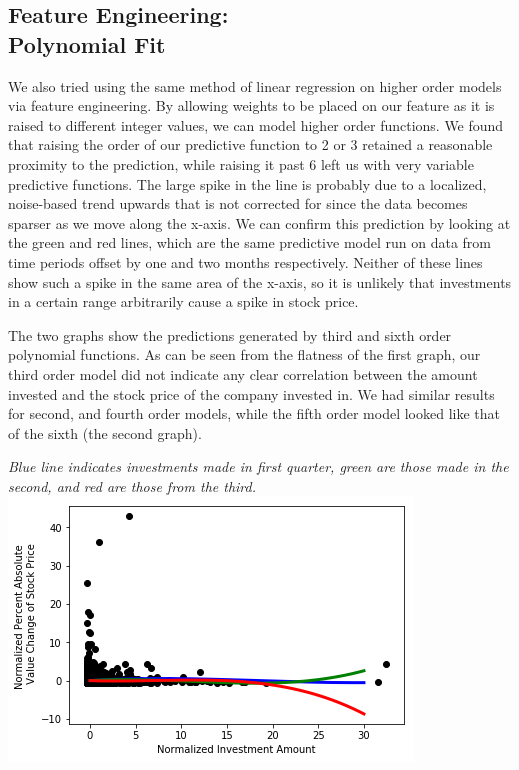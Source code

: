 \documentclass{article}
\begin{document}
\begin{multicols}{2}
\subsection*{Feature Engineering: \\Polynomial Fit}
We also tried using the same method of linear regression on higher order models via feature engineering. By allowing weights to be placed on our feature as it is raised to different integer values, we can model higher order functions. We found that raising the order of our predictive function to 2 or 3 retained a reasonable proximity to the prediction, while raising it past 6 left us with very variable predictive functions. The large spike in the line is probably due to a localized, noise-based trend upwards that is not corrected for since the data becomes sparser as we move along the x-axis. We can confirm this prediction by looking at the green and red lines, which are the same predictive model run on data from time periods offset by one and two months respectively. Neither of these lines show such a spike in the same area of the x-axis, so it is unlikely that investments in a certain range arbitrarily cause a spike in stock price.

The two graphs show the predictions generated by third and sixth order polynomial functions. As can be seen from the flatness of the first graph, our third order model did not indicate any clear correlation between the amount invested and the stock price of the company invested in. We had similar results for second, and fourth order models, while the fifth order model looked like that of the sixth (the second graph). 



\end{multicols}
\textit{Blue line indicates investments made in first quarter, green are those made in the second, and red are those from the third.}\\
\includegraphics[scale = 0.6]{polyfit.png}
\end{document}
